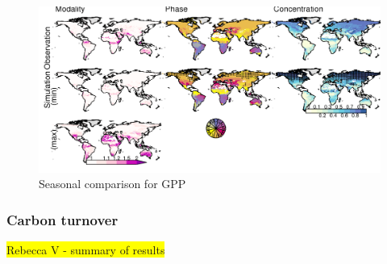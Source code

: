 \documentclass[bg, manuscript]{copernicus}
\newcommand{\hilight}[1]{\colorbox{yellow}{#1}}
\begin{document}
\begin{figure}[t]
    \includegraphics[width=12cm]{figs/GPP/fire_var_seasonality-maps-MPCcontrol-gpp.png}
    \caption{Seasonal comparison for GPP \label{fig:GPPseasonalMap}}
\end{figure}


\subsubsection{Carbon turnover}
\hilight{Rebecca V - summary of results}
\end{document}
